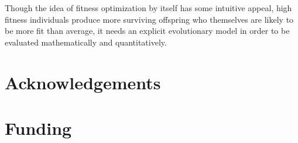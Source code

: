 \documentclass[11pt]{article}
\begin{document}
Though the idea of fitness optimization by itself has some intuitive appeal, high fitness individuals produce more surviving offspring who themselves are likely to be more fit than average, it needs an explicit evolutionary model in order to be evaluated mathematically and quantitatively.




\section{Acknowledgements}

\section{Funding}

\clearpage
\printbibliography
\end{document}
